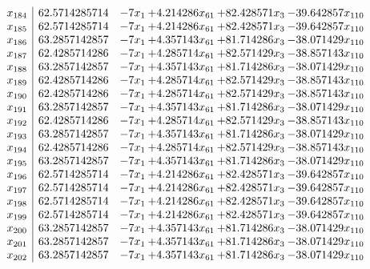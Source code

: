 \documentclass[11pt]{article}
\begin{document}
\[\begin{array}{c| c c@{\hskip 2pt} c@{\hskip 2pt} c@{\hskip 2pt} c@{\hskip 2pt} }
 x_{184}   &  62.5714285714 & -7 x_{1} & + 4.214286 x_{61} & + 82.428571 x_{3} & -39.642857 x_{110}\\
 x_{185}   &  62.5714285714 & -7 x_{1} & + 4.214286 x_{61} & + 82.428571 x_{3} & -39.642857 x_{110}\\
 x_{186}   &  63.2857142857 & -7 x_{1} & + 4.357143 x_{61} & + 81.714286 x_{3} & -38.071429 x_{110}\\
 x_{187}   &  62.4285714286 & -7 x_{1} & + 4.285714 x_{61} & + 82.571429 x_{3} & -38.857143 x_{110}\\
 x_{188}   &  63.2857142857 & -7 x_{1} & + 4.357143 x_{61} & + 81.714286 x_{3} & -38.071429 x_{110}\\
 x_{189}   &  62.4285714286 & -7 x_{1} & + 4.285714 x_{61} & + 82.571429 x_{3} & -38.857143 x_{110}\\
 x_{190}   &  62.4285714286 & -7 x_{1} & + 4.285714 x_{61} & + 82.571429 x_{3} & -38.857143 x_{110}\\
 x_{191}   &  63.2857142857 & -7 x_{1} & + 4.357143 x_{61} & + 81.714286 x_{3} & -38.071429 x_{110}\\
 x_{192}   &  62.4285714286 & -7 x_{1} & + 4.285714 x_{61} & + 82.571429 x_{3} & -38.857143 x_{110}\\
 x_{193}   &  63.2857142857 & -7 x_{1} & + 4.357143 x_{61} & + 81.714286 x_{3} & -38.071429 x_{110}\\
 x_{194}   &  62.4285714286 & -7 x_{1} & + 4.285714 x_{61} & + 82.571429 x_{3} & -38.857143 x_{110}\\
 x_{195}   &  63.2857142857 & -7 x_{1} & + 4.357143 x_{61} & + 81.714286 x_{3} & -38.071429 x_{110}\\
 x_{196}   &  62.5714285714 & -7 x_{1} & + 4.214286 x_{61} & + 82.428571 x_{3} & -39.642857 x_{110}\\
 x_{197}   &  62.5714285714 & -7 x_{1} & + 4.214286 x_{61} & + 82.428571 x_{3} & -39.642857 x_{110}\\
 x_{198}   &  62.5714285714 & -7 x_{1} & + 4.214286 x_{61} & + 82.428571 x_{3} & -39.642857 x_{110}\\
 x_{199}   &  62.5714285714 & -7 x_{1} & + 4.214286 x_{61} & + 82.428571 x_{3} & -39.642857 x_{110}\\
 x_{200}   &  63.2857142857 & -7 x_{1} & + 4.357143 x_{61} & + 81.714286 x_{3} & -38.071429 x_{110}\\
 x_{201}   &  63.2857142857 & -7 x_{1} & + 4.357143 x_{61} & + 81.714286 x_{3} & -38.071429 x_{110}\\
 x_{202}   &  63.2857142857 & -7 x_{1} & + 4.357143 x_{61} & + 81.714286 x_{3} & -38.071429 x_{110}\\

\end{array}\]
\end{document}
